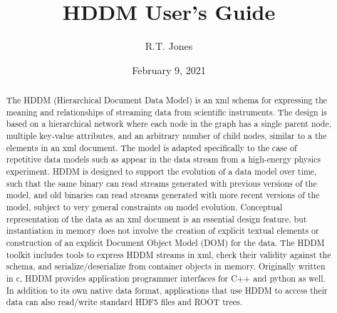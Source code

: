 \documentclass{revtex4}
\begin{document}

\title{HDDM User's Guide}


\author{R.T. Jones}


\date{February 9, 2021}

\begin{abstract}
The HDDM (Hierarchical Document Data Model) is an xml schema for expressing
the meaning and relationships of streaming data from scientific instruments.
The design is based on a hierarchical network where each node in the graph
has a single parent node, multiple key-value attributes, and an arbitrary
number of child nodes, similar to a the elements in an xml document.
The model is adapted specifically to the case of repetitive data models
such as appear in the data stream from a high-energy physics experiment.
HDDM is designed to support the evolution of a data model over time, such
that the same binary can read streams generated with previous versions of
the model, and old binaries can read streams generated with more recent
versions of the model, subject to very general constraints on model
evolution. Conceptual representation of the data as an xml document is
an essential design feature, but instantiation in memory does not
involve the creation of explicit textual elements or construction of
an explicit Document Object Model (DOM) for the data.
The HDDM toolkit includes tools to express HDDM streams in xml, check their
validity against the schema, and serialize/deserialize from container
objects in memory. Originally written in c, HDDM provides application
programmer interfaces for C++ and python as well. In addition to its own
native data format, applications that use HDDM to access their data can
also read/write standard HDF5 files and ROOT trees.
\end{abstract}
\end{document}
